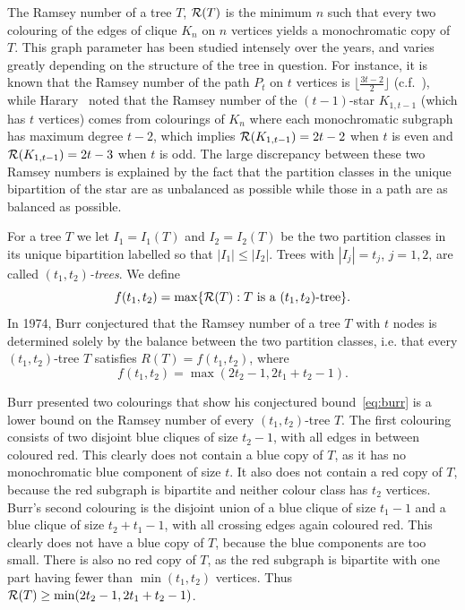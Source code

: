 \documentclass[11pt]{article}
\begin{document}
The Ramsey number of a tree $T$, ${\cal R}(T)$  is the minimum $n$ such that every two colouring of the edges of clique $K_n$ on $n$ vertices yields a monochromatic copy of $T$. This graph parameter has been studied intensely over the years, and varies greatly depending on the structure of the tree in question. For instance, it is known that the Ramsey number of the path $P_t$ on $t$ vertices is $\lfloor \frac{3t-2}{2} \rfloor$ (c.f.~\cite{GG}), while Harary~\cite{Ha} noted that the Ramsey number of the $(t-1)$-star $K_{1, t-1}$ (which has $t$ vertices) comes from colourings of $K_n$ where each monochromatic subgraph has maximum degree $t-2$, which implies ${\cal R}(K_{1,t-1}) = 2t-2$ when $t$ is even and ${\cal R}(K_{1,t-1}) = 2t-3$ when $t$ is odd. The large discrepancy between these two Ramsey numbers is explained by the fact that the partition classes in the unique bipartition of the star are as unbalanced as possible while those in a path are as balanced as possible. 

For a tree $T$ we let $I_1=I_1(T)$ and $I_2=I_2(T)$ be the two partition classes in its unique bipartition labelled so that $|I_1|\le|I_2|$. Trees with $|I_j|=t_j$, $j=1,2$,  are called {\it $(t_1,t_2)$-trees}. 
We define $$f(t_1, t_2) = \max \{ {\cal R}(T): T \text{ is a } (t_1, t_2)\text{-tree} \}.$$
In  1974, Burr \cite{Burr} conjectured that  the Ramsey number of a tree $T$ with $t$ nodes is determined solely by the balance between the two partition classes, i.e. that every $(t_1,t_2)$-tree $T$ satisfies $R(T)=f(t_1,t_2)$, where 
\begin{equation}\label{eq:burr}
f(t_1,t_2)=\max(2t_2-1, 2t_1 + t_2-1).
\end{equation}

Burr presented two colourings that show his conjectured bound~\eqref{eq:burr} is a lower bound on the Ramsey number of every $(t_1,t_2)$-tree $T$. The first colouring consists of two disjoint blue cliques of size $t_2-1$, with all edges in between coloured red. This clearly does not contain a blue copy of $T$, as it has no monochromatic blue component of size $t$. 
It also does not contain a red copy of $T$, because the red subgraph is bipartite and neither colour class has $t_2$ vertices.  Burr's second colouring is the disjoint union of a blue clique of size $t_1-1$ and a blue clique of size $t_2+t_1-1$, with all crossing edges again coloured red. This clearly does not have a blue copy of $T$, because the blue components are too small. There is also no red copy of $T$, as the red subgraph is bipartite with one part having fewer than $\min(t_1,t_2)$ vertices. 
Thus ${\cal R}(T) \ge \min(2t_2-1,2t_1+t_2-1)$. 
\end{document}
